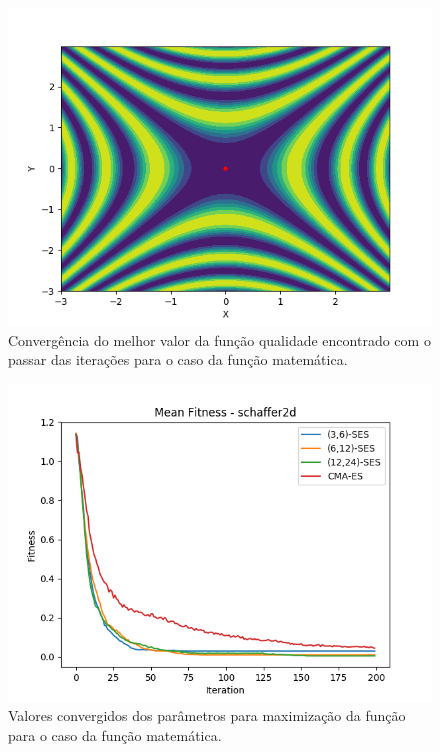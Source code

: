 \documentclass[conference]{IEEEtran}
\begin{document}
\begin{figure}[htbp]
\centering
\centerline{\includegraphics[scale=0.4]{imagens/schaffer2d/cmaes.png}}
\caption{Convergência do melhor valor da função qualidade encontrado com o passar das iterações para o caso da função matemática.}
\label{schaffer2d/cmaes}
\end{figure}

\begin{figure}[htbp]
\centering
\centerline{\includegraphics[scale=0.4]{imagens/schaffer2d/mean_fitness.png}}
\caption{Valores convergidos dos parâmetros para maximização da função para o caso da função matemática.}
\label{schaffer2d/mean_fitness}
\end{figure}
\end{document}

